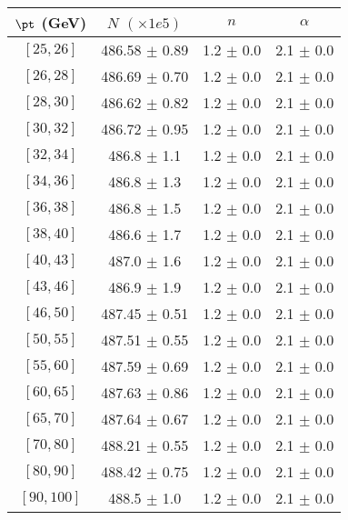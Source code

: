 \begin{tabular}{c||c|c|c}
$\pt$ (GeV) & $N$ $(\times1e5)$ & $n$ & $\alpha$ \\
\hline
$[25, 26]$ & 486.58 $\pm$ 0.89 & 1.2 $\pm$ 0.0 & 2.1 $\pm$ 0.0\\
$[26, 28]$ & 486.69 $\pm$ 0.70 & 1.2 $\pm$ 0.0 & 2.1 $\pm$ 0.0\\
$[28, 30]$ & 486.62 $\pm$ 0.82 & 1.2 $\pm$ 0.0 & 2.1 $\pm$ 0.0\\
$[30, 32]$ & 486.72 $\pm$ 0.95 & 1.2 $\pm$ 0.0 & 2.1 $\pm$ 0.0\\
$[32, 34]$ & 486.8 $\pm$ 1.1 & 1.2 $\pm$ 0.0 & 2.1 $\pm$ 0.0\\
$[34, 36]$ & 486.8 $\pm$ 1.3 & 1.2 $\pm$ 0.0 & 2.1 $\pm$ 0.0\\
$[36, 38]$ & 486.8 $\pm$ 1.5 & 1.2 $\pm$ 0.0 & 2.1 $\pm$ 0.0\\
$[38, 40]$ & 486.6 $\pm$ 1.7 & 1.2 $\pm$ 0.0 & 2.1 $\pm$ 0.0\\
$[40, 43]$ & 487.0 $\pm$ 1.6 & 1.2 $\pm$ 0.0 & 2.1 $\pm$ 0.0\\
$[43, 46]$ & 486.9 $\pm$ 1.9 & 1.2 $\pm$ 0.0 & 2.1 $\pm$ 0.0\\
$[46, 50]$ & 487.45 $\pm$ 0.51 & 1.2 $\pm$ 0.0 & 2.1 $\pm$ 0.0\\
$[50, 55]$ & 487.51 $\pm$ 0.55 & 1.2 $\pm$ 0.0 & 2.1 $\pm$ 0.0\\
$[55, 60]$ & 487.59 $\pm$ 0.69 & 1.2 $\pm$ 0.0 & 2.1 $\pm$ 0.0\\
$[60, 65]$ & 487.63 $\pm$ 0.86 & 1.2 $\pm$ 0.0 & 2.1 $\pm$ 0.0\\
$[65, 70]$ & 487.64 $\pm$ 0.67 & 1.2 $\pm$ 0.0 & 2.1 $\pm$ 0.0\\
$[70, 80]$ & 488.21 $\pm$ 0.55 & 1.2 $\pm$ 0.0 & 2.1 $\pm$ 0.0\\
$[80, 90]$ & 488.42 $\pm$ 0.75 & 1.2 $\pm$ 0.0 & 2.1 $\pm$ 0.0\\
$[90, 100]$ & 488.5 $\pm$ 1.0 & 1.2 $\pm$ 0.0 & 2.1 $\pm$ 0.0\\
\end{tabular}
